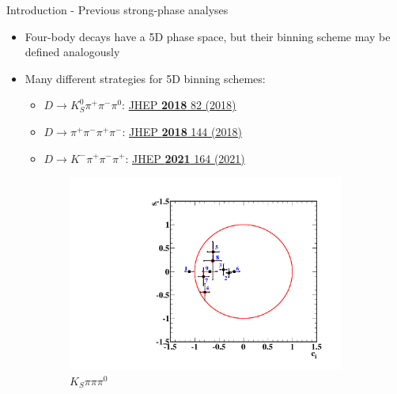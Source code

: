 \documentclass{beamer}
\begin{document}
\begin{frame}{Introduction - Previous strong-phase analyses}
  \begin{itemize}
    \setlength\itemsep{1.0em}
    \item{Four-body decays have a 5D phase space, but their binning scheme may be defined analogously}
    \item{Many different strategies for 5D binning schemes:}
    \begin{itemize}
      \item{$D\to K_S^0\pi^+\pi^-\pi^0$: \href{https://link.springer.com/article/10.1007/JHEP01(2018)082}{JHEP \textbf{2018} 82 (2018)}}
      \item{$D\to\pi^+\pi^-\pi^+\pi^-$: \href{https://link.springer.com/article/10.1007/JHEP01(2018)144}{JHEP \textbf{2018} 144 (2018)}}
      \item{$D\to K^-\pi^+\pi^-\pi^+$: \href{https://link.springer.com/article/10.1007/JHEP05(2021)164}{JHEP \textbf{2021} 164 (2021)}}
    \end{itemize}
  \end{itemize}
  \begin{figure}
    \centering
    \begin{subfigure}{0.30\textwidth}
      \centering
      \includegraphics[width=1.0\textwidth]{Plots/KSpipipi0_cisi.pdf}
      \caption{$K_S\pi\pi\pi^0$}
    \end{subfigure}%
    \begin{subfigure}{0.39\textwidth}
      \centering

\end{subfigure}
\end{figure}
\end{frame}
\end{document}
